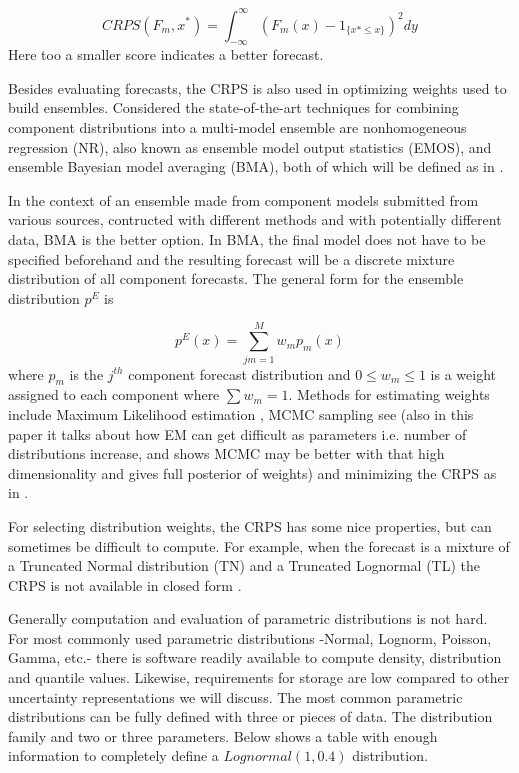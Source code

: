 \documentclass{article}\usepackage[]{graphicx}\usepackage[]{color}
\begin{document}
\begin{equation}
\label{eq:crps}
  CRPS(F_m, x^*) = \int_{-\infty}^{\infty} (F_m(x)- 1_{\{x*\leq x\}})^2 dy
\end{equation}
Here too a smaller score indicates a better forecast.

Besides evaluating forecasts, the CRPS is also used in optimizing weights used
to build ensembles. Considered the state-of-the-art techniques for combining 
component distributions
into a multi-model ensemble are nonhomogeneous regression (NR), also known as
ensemble model output statistics (EMOS), and ensemble Bayesian model averaging
(BMA), both of which will be defined as in \cite{gneiting2014probabilistic}.

In the context of an ensemble made from component models submitted from various
sources, contructed with different methods and with potentially different data,
BMA is the better option. In BMA, the final model does not have to be specified
beforehand and the resulting forecast will be a discrete mixture distribution
of all component forecasts. The general form for the ensemble distribution $p^E$
is

\begin{equation}
\label{eq:bma}
  p^E(x) = \sum_{jm=1}^M w_mp_m(x)
\end{equation}
where $p_m$ is the $j^{th}$ component forecast distribution and 
$0 \leq w_m \leq 1$ is a weight assigned to each component where $\sum w_m = 1$.
Methods for estimating weights include Maximum Likelihood estimation
\cite{raftery2005using}, MCMC 
sampling see \cite{vrugt2008ensemble} (also in this paper it talks about how 
EM can get difficult as parameters i.e. number of distributions increase, and 
shows MCMC may be better with that high dimensionality and gives full posterior
of weights)
and minimizing the CRPS as in 
\cite{baran2018combining}.

For selecting distribution weights, the CRPS has some nice properties, but can 
sometimes be
difficult to compute. For example, when the forecast is a mixture of a 
Truncated Normal distribution (TN) and a Truncated Lognormal (TL) the CRPS is 
not available in closed form \cite{baran2018combining}.

Generally computation and evaluation of parametric distributions is not hard. 
For most commonly used parametric distributions -Normal, Lognorm, Poisson,
Gamma, etc.- there is software readily available to compute density, 
distribution and quantile values. Likewise, requirements for storage are low 
compared to other uncertainty representations we will discuss. The most common
parametric distributions can be fully defined with three or pieces of data.
The distribution family and two or three parameters. Below shows a table with
enough information to completely define a $Lognormal(1,0.4)$ distribution.
\end{document}
